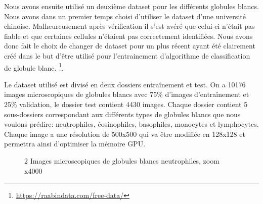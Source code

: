 Nous avons ensuite utilisé un deuxième dataset pour les différents globules blancs. Nous avons dans un premier temps choisi d’utiliser le dataset d’une université chinoise. Malheureusement après vérification il s’est avéré que celui-ci n’était pas fiable et que certaines cellules n’étaient pas correctement identifiées. Nous avons donc fait le choix de changer de dataset pour un plus récent ayant été clairement créé dans le but d’être utilisé pour l’entrainement d’algorithme de classification de globule blanc. \footnote{\url{https://raabindata.com/free-data/}}.

Le dataset utilisé est divisé en deux dossiers entraînement et test. On a 10176 images microscopiques de globules blancs avec 75\% d'images d'entraînement et 25\% validation, le dossier test contient 4430 images.
Chaque dossier contient 5 sous-dossiers correspondant aux différents types de globules blancs que nous voulons prédire: neutrophiles, éosinophiles, basophiles, monocytes et lymphocytes.
Chaque image a une résolution de 500x500 qui va être modifiée en 128x128 et permettra ainsi d'optimiser la mémoire GPU.


\begin{figure}
    \centering
    \qquad
    \caption{2 Images microscopiques de globules blancs neutrophiles, zoom x4000}
    \label{fig:example}
\end{figure}

